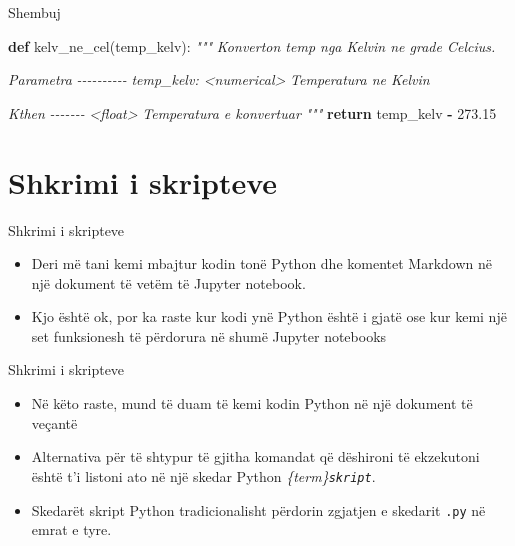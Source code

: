 \documentclass[
  ignorenonframetext,
]{beamer}
\newenvironment{Shaded}{\begin{snugshade}}{\end{snugshade}}
\newcommand{\CommentTok}[1]{\textcolor[rgb]{0.56,0.35,0.01}{\textit{#1}}}
\newcommand{\ControlFlowTok}[1]{\textcolor[rgb]{0.13,0.29,0.53}{\textbf{#1}}}
\newcommand{\FloatTok}[1]{\textcolor[rgb]{0.00,0.00,0.81}{#1}}
\newcommand{\KeywordTok}[1]{\textcolor[rgb]{0.13,0.29,0.53}{\textbf{#1}}}
\newcommand{\NormalTok}[1]{#1}
\newcommand{\OperatorTok}[1]{\textcolor[rgb]{0.81,0.36,0.00}{\textbf{#1}}}
\begin{document}
\begin{frame}[fragile]{Shembuj}
\protect\hypertarget{shembuj-1}{}
\begin{Shaded}
\begin{Highlighting}[]
\KeywordTok{def}\NormalTok{ kelv\_ne\_cel(temp\_kelv):}
    \CommentTok{"""}
\CommentTok{    Konverton temp nga Kelvin ne grade Celcius.}

\CommentTok{    Parametra}
\CommentTok{    {-}{-}{-}{-}{-}{-}{-}{-}{-}{-}}
\CommentTok{    temp\_kelv: \textless{}numerical\textgreater{}}
\CommentTok{        Temperatura ne Kelvin}

\CommentTok{    Kthen}
\CommentTok{    {-}{-}{-}{-}{-}{-}{-}}
\CommentTok{    \textless{}float\textgreater{}}
\CommentTok{        Temperatura e konvertuar}
\CommentTok{    """}
    \ControlFlowTok{return}\NormalTok{ temp\_kelv }\OperatorTok{{-}} \FloatTok{273.15}
\end{Highlighting}
\end{Shaded}
\end{frame}

\hypertarget{shkrimi-i-skripteve}{%
\section{Shkrimi i skripteve}\label{shkrimi-i-skripteve}}

\begin{frame}{Shkrimi i skripteve}
\protect\hypertarget{shkrimi-i-skripteve-1}{}
\begin{itemize}
\item
  Deri më tani kemi mbajtur kodin tonë Python dhe komentet Markdown në
  një dokument të vetëm të Jupyter notebook.
\item
  Kjo është ok, por ka raste kur kodi ynë Python është i gjatë ose kur
  kemi një set funksionesh të përdorura në shumë Jupyter notebooks
\end{itemize}
\end{frame}

\begin{frame}[fragile]{Shkrimi i skripteve}
\protect\hypertarget{shkrimi-i-skripteve-2}{}
\begin{itemize}
\item
  Në këto raste, mund të duam të kemi kodin Python në një dokument të
  veçantë
\item
  Alternativa për të shtypur të gjitha komandat që dëshironi të
  ekzekutoni është t'i listoni ato në një skedar Python
  \emph{\{term\}\texttt{skript}}.
\item
  Skedarët skript Python tradicionalisht përdorin zgjatjen e skedarit
  \texttt{.py} në emrat e tyre.
\end{itemize}
\end{frame}
\end{document}
